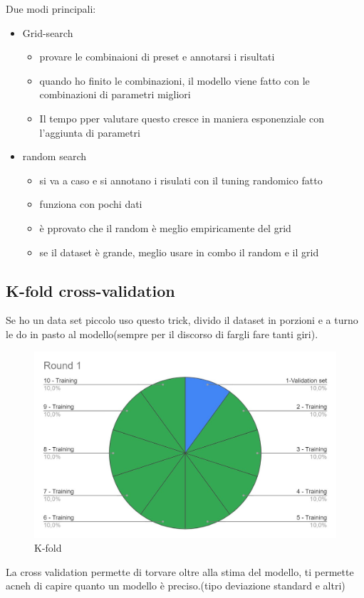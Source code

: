 Due modi principali:
\begin{itemize}
    \item Grid-search
    \begin{itemize}
        \item provare le combinaioni di preset e annotarsi i risultati
        \item quando ho finito le combinazioni, il modello viene fatto con le combinazioni di parametri migliori
        \item Il tempo pper valutare questo cresce in maniera esponenziale con l'aggiunta di parametri
    \end{itemize}
    \item random search
    \begin{itemize}
        \item si va a caso e si annotano i risulati con il tuning randomico fatto
        \item funziona con pochi dati
        \item è pprovato che il random è meglio empiricamente del grid
        \item se il dataset è grande, meglio usare in combo il random e il grid
    \end{itemize}
\end{itemize}


\subsection{K-fold cross-validation}
Se ho un data set piccolo uso questo trick,
divido il dataset in porzioni e a turno le do in pasto al modello(sempre per il discorso di fargli fare tanti giri).

\begin{figure}[H]
    \centering
    \includegraphics[width=0.6\linewidth]{imgs/k-fold}
    \caption{K-fold}
    \label{fig:kold}
\end{figure}


La cross validation permette di torvare oltre alla stima del modello,
ti permette acneh di capire quanto un modello è preciso.(tipo deviazione standard e altri)


